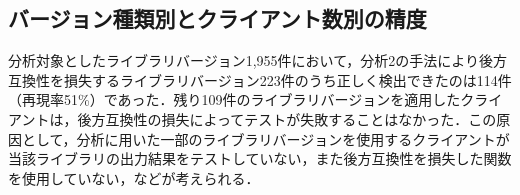 \documentclass[submit]{ipsj}
\newcommand{\todo}[1]{\colorbox{yellow}{{\bf TODO}:}{\color{red} {\textbf{[#1]}}}}
\begin{document}
{%



\subsection{バージョン種類別とクライアント数別の精度}

分析対象としたライブラリバージョン1,955件において，分析2の手法により後方互換性を損失するライブラリバージョン223件のうち正しく検出できたのは114件（再現率51\%）であった．残り109件のライブラリバージョンを適用したクライアントは，後方互換性の損失によってテストが失敗することはなかった．この原因として，分析に用いた一部のライブラリバージョンを使用するクライアントが当該ライブラリの出力結果をテストしていない，また後方互換性を損失した関数を使用していない，などが考えられる．

}
\end{document}
